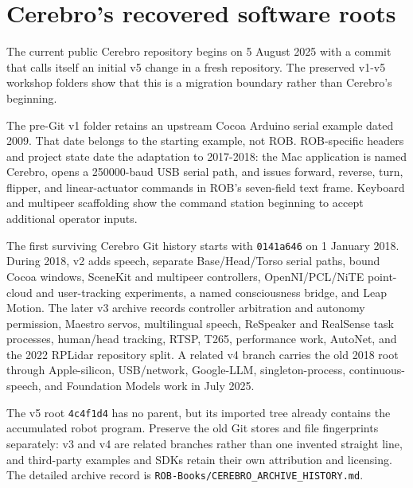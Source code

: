 \documentclass[10pt,openany]{book}
\begin{document}

\section{Cerebro's recovered software roots}

The current public Cerebro repository begins on 5 August 2025 with a commit that calls itself an initial v5 change in a fresh repository. The preserved v1-v5 workshop folders show that this is a migration boundary rather than Cerebro's beginning.

The pre-Git v1 folder retains an upstream Cocoa Arduino serial example dated 2009. That date belongs to the starting example, not ROB. ROB-specific headers and project state date the adaptation to 2017-2018: the Mac application is named Cerebro, opens a 250000-baud USB serial path, and issues forward, reverse, turn, flipper, and linear-actuator commands in ROB's seven-field text frame. Keyboard and multipeer scaffolding show the command station beginning to accept additional operator inputs.

The first surviving Cerebro Git history starts with \texttt{0141a646} on 1 January 2018. During 2018, v2 adds speech, separate Base/Head/Torso serial paths, bound Cocoa windows, SceneKit and multipeer controllers, OpenNI/PCL/NiTE point-cloud and user-tracking experiments, a named consciousness bridge, and Leap Motion. The later v3 archive records controller arbitration and autonomy permission, Maestro servos, multilingual speech, ReSpeaker and RealSense task processes, human/head tracking, RTSP, T265, performance work, AutoNet, and the 2022 RPLidar repository split. A related v4 branch carries the old 2018 root through Apple-silicon, USB/network, Google-LLM, singleton-process, continuous-speech, and Foundation Models work in July 2025.

The v5 root \texttt{4c4f1d4} has no parent, but its imported tree already contains the accumulated robot program. Preserve the old Git stores and file fingerprints separately: v3 and v4 are related branches rather than one invented straight line, and third-party examples and SDKs retain their own attribution and licensing. The detailed archive record is \texttt{ROB-Books/CEREBRO\_ARCHIVE\_HISTORY.md}.
\end{document}
